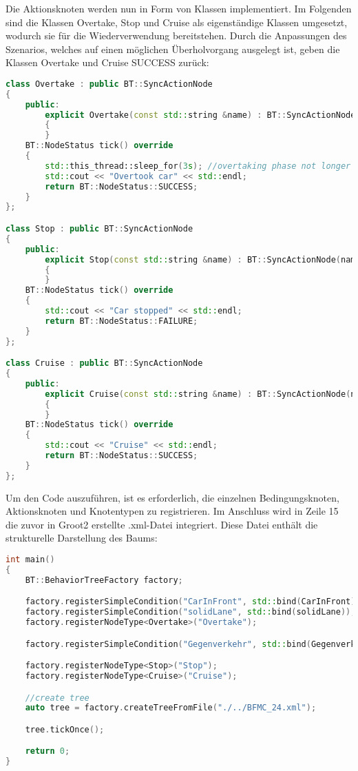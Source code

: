 \newpage
Die Aktionsknoten werden nun in Form von Klassen implementiert. Im Folgenden sind die Klassen Overtake, Stop und Cruise als eigenständige Klassen umgesetzt, wodurch sie für die Wiederverwendung bereitstehen. Durch die Anpassungen des Szenarios, welches auf einen möglichen Überholvorgang ausgelegt ist, geben die Klassen Overtake und Cruise SUCCESS zurück:

\begin{lstlisting}[language=C++, caption={Aktionsknoten}]
class Overtake : public BT::SyncActionNode
{
    public:
        explicit Overtake(const std::string &name) : BT::SyncActionNode(name, {})
        {
        }
    BT::NodeStatus tick() override
    {
        std::this_thread::sleep_for(3s); //overtaking phase not longer than 2 minutes
        std::cout << "Overtook car" << std::endl;
        return BT::NodeStatus::SUCCESS;
    }
};

class Stop : public BT::SyncActionNode
{
    public:
        explicit Stop(const std::string &name) : BT::SyncActionNode(name, {})
        {
        }
    BT::NodeStatus tick() override
    {
        std::cout << "Car stopped" << std::endl;
        return BT::NodeStatus::FAILURE;
    }
};

class Cruise : public BT::SyncActionNode
{
    public:
        explicit Cruise(const std::string &name) : BT::SyncActionNode(name, {})
        {
        }
    BT::NodeStatus tick() override
    {
        std::cout << "Cruise" << std::endl;
        return BT::NodeStatus::SUCCESS;
    }
};
\end{lstlisting}

\newpage
Um den Code auszuführen, ist es erforderlich, die einzelnen Bedingungsknoten, Aktionsknoten und Knotentypen zu registrieren. Im Anschluss wird in Zeile 15 die zuvor in Groot2 erstellte .xml-Datei integriert. Diese Datei enthält die strukturelle Darstellung des Baums:

\begin{lstlisting}[language=C++, caption={Ausführen des Codes - main()}]
int main()
{
    BT::BehaviorTreeFactory factory;

    factory.registerSimpleCondition("CarInFront", std::bind(CarInFront));
    factory.registerSimpleCondition("solidLane", std::bind(solidLane));
    factory.registerNodeType<Overtake>("Overtake");

    factory.registerSimpleCondition("Gegenverkehr", std::bind(Gegenverkehr));

    factory.registerNodeType<Stop>("Stop");
    factory.registerNodeType<Cruise>("Cruise");

    //create tree
    auto tree = factory.createTreeFromFile("./../BFMC_24.xml");

    tree.tickOnce();

    return 0;
}

\end{lstlisting}







